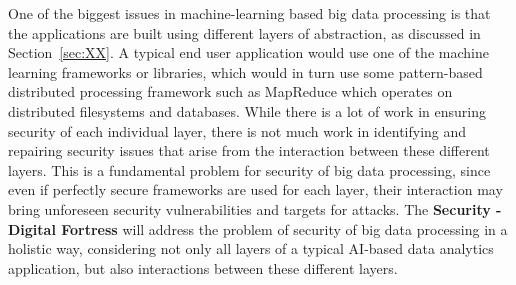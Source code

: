 \documentclass[a4paper,11pt]{article}
\newcommand{\project}[1]{\textbf{#1}\xspace}
\newcommand{\SECURITY}{\project{Security - Digital Fortress}}
\newcommand{\TheProject}{\SECURITY}
\begin{document}
One of the biggest issues in machine-learning based big data processing is that the applications are built using different layers of abstraction, as discussed in Section~\ref{sec:XX}. A typical end user application would use one of the machine learning frameworks or libraries, which would in turn use some pattern-based distributed processing framework such as MapReduce which operates on distributed filesystems and databases. While there is a lot of work in ensuring security of each individual layer, there is not much work in identifying and repairing security issues that arise from the interaction between these different layers. This is a fundamental problem for security of big data processing, since even if perfectly secure frameworks are used for each layer, their interaction may bring unforeseen security vulnerabilities and targets for attacks. The \TheProject{} will address the problem of security of big data processing in a holistic way, considering not only all layers of a typical AI-based data analytics application, but also interactions between these different layers.

 
\end{document}
